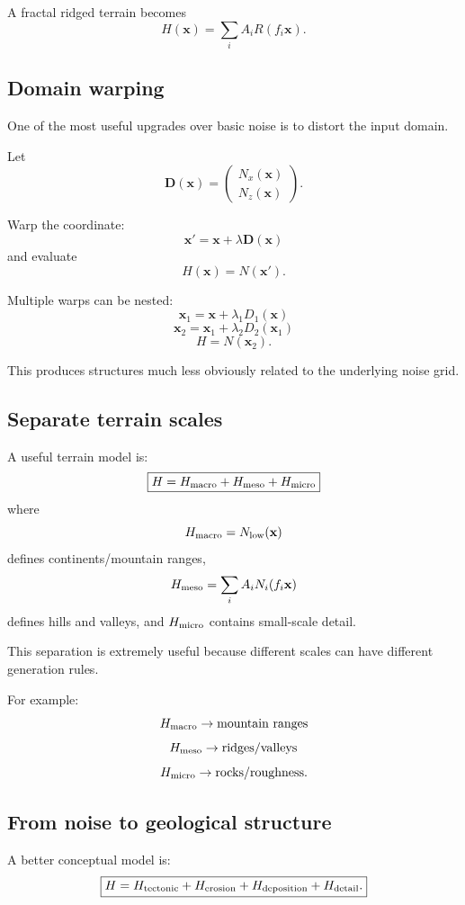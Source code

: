 \documentclass[12pt]{article}
\begin{document}
	A fractal ridged terrain becomes
	\[
	H(\mathbf x)=
	\sum_i A_i R(f_i \mathbf x).
	\]
	
	\subsection{Domain warping}
	
	One of the most useful upgrades over basic noise is to distort the input domain.
	
	Let
	\[
	\mathbf D(\mathbf x)=
	\begin{pmatrix}
		N_x(\mathbf x) \\
		N_z(\mathbf x)
	\end{pmatrix}.
	\]
	
	Warp the coordinate:
	\[
	\boxed{
		\mathbf x'=
		\mathbf x+
		\lambda \mathbf D(\mathbf x)
	}
	\]
	and evaluate
	\[
	\boxed{
		H(\mathbf x)=N(\mathbf x').
	}
	\]
	
	Multiple warps can be nested:
	\[
	\mathbf x_1 =
	\mathbf x+
	\lambda_1 D_1(\mathbf x)
	\]
	\[
	\mathbf x_2 =
	\mathbf x_1+
	\lambda_2 D_2(\mathbf x_1)
	\]
	\[
	H=N(\mathbf x_2).
	\]
	
	This produces structures much less obviously related to the underlying noise grid.
	
	\subsection{Separate terrain scales}
	
	A useful terrain model is:
	\[
	\boxed{
		H=
		H_{\rm macro}
		+ H_{\rm meso}
		+ H_{\rm micro}
	}
	\]
	where
	\[
	H_{\rm macro}= N_{\rm low}(\mathbf x)
	\]
	defines continents/mountain ranges,
	\[
	H_{\rm meso}= \sum_i A_i N_i(f_i \mathbf x)
	\]
	defines hills and valleys,
	and $H_{\rm micro}$ contains small-scale detail.
	
	This separation is extremely useful because different scales can have different generation rules.
	
	For example:
	\[
	H_{\rm macro} \rightarrow \text{mountain ranges}
	\]
	\[
	H_{\rm meso} \rightarrow \text{ridges/valleys}
	\]
	\[
	H_{\rm micro} \rightarrow \text{rocks/roughness}.
	\]
	
	\subsection{From noise to geological structure}
	
	A better conceptual model is:
	\[
	\boxed{
		H=
		H_{\rm tectonic}
		+ H_{\rm erosion}
		+ H_{\rm deposition}
		+ H_{\rm detail}.
	}
	\]
	
\end{document}
